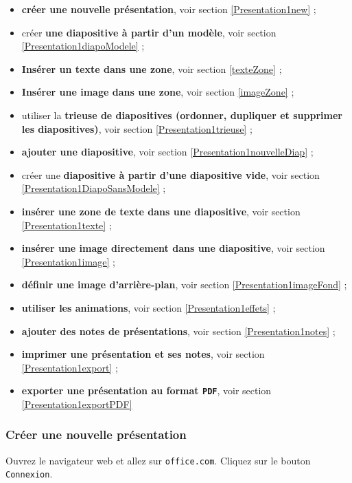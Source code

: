\begin{itemize}   
\item \textbf{créer une nouvelle présentation}, voir section \vref{Presentation1new} ;
\item créer \textbf{une diapositive à partir d'un modèle}, voir section \vref{Presentation1diapoModele} ;
\item \textbf{Insérer un texte dans une zone}, voir section \vref{texteZone} ;
\item \textbf{Insérer une image dans une zone}, voir section \vref{imageZone} ;
\item utiliser la \textbf{trieuse de diapositives (ordonner, dupliquer et supprimer les diapositives)}, voir section \vref{Presentation1trieuse} ;
\item \textbf{ajouter une diapositive}, voir section \vref{Presentation1nouvelleDiap} ;
\item créer une \textbf{diapositive à partir d'une diapositive vide}, voir section \vref{Presentation1DiapoSansModele} ;
\item \textbf{insérer une zone de texte dans une diapositive}, voir section \vref{Presentation1texte} ;
\item \textbf{insérer une image directement dans une diapositive}, voir section \vref{Presentation1image} ;
\item \textbf{définir une image d'arrière-plan}, voir section \vref{Presentation1imageFond} ;
\item \textbf{utiliser les animations}, voir section \vref{Presentation1effets} ;
\item \textbf{ajouter des notes de présentations}, voir section \vref{Presentation1notes} ;
\item \textbf{imprimer une présentation et ses notes}, voir section \vref{Presentation1export} ;
\item \textbf{exporter une présentation au format \texttt{PDF}}, voir section \vref{Presentation1exportPDF} 
\end{itemize}  





\subsubsection{Créer une nouvelle présentation}\label{Presentation1new}

Ouvrez le navigateur web et allez sur \texttt{office.com}. Cliquez sur le bouton \texttt{Connexion}.

